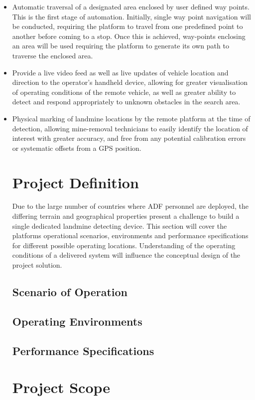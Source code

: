 \documentclass[main.tex]{subfiles}
\begin{document}
\begin{itemize}
\item Automatic traversal of a designated area enclosed by user defined way points. This is the first stage of automation. Initially, single way point navigation will be conducted, requiring the platform to travel from one predefined point to another before coming to a stop. Once this is achieved, way-points enclosing an area will be used requiring the platform to generate its own path to traverse the enclosed area.
\item Provide a live video feed as well as live updates of vehicle location and direction to the operator's handheld device, allowing for greater visualisation of operating conditions of the remote vehicle, as well as greater ability to detect and respond appropriately to unknown obstacles in the search area.
\item Physical marking of landmine locations by the remote platform at the time of detection, allowing mine-removal technicians to easily identify the location of interest with greater accuracy, and free from any potential calibration errors or systematic offsets from a GPS position.

\section{Project Definition}
Due to the large number of countries where ADF personnel are deployed, the differing terrain and geographical properties present a challenge to build a single dedicated landmine detecting device. This section will cover the platforms operational scenarios, environments and performance specifications for different possible operating locations. Understanding of the operating conditions of a delivered system will influence the conceptual design of the project solution.
\subsection{Scenario of Operation}

\subsection{Operating Environments}

\subsection{Performance Specifications}

\section{Project Scope}
\end{itemize}
\end{document}
